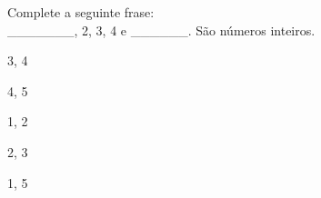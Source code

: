 \question[10]
Complete a seguinte frase:\\
_______, 2, 3, 4 e ______. São números inteiros.
\\
\begin{choices}
\item 3, 4 
\item 4, 5 
\item 1, 2 
\item 2, 3
\item 1, 5 %
\end{choices}
\answerline

